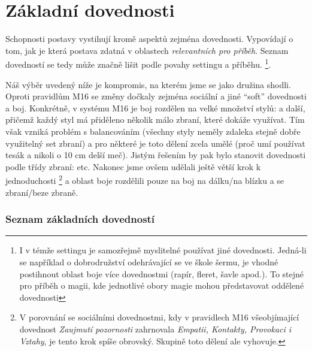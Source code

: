 \chapter{Základní dovednosti}
\label{chap:dovednosti}

Schopnosti postavy vystihují kromě aspektů zejména dovednosti. Vypovídají o tom, jak je která postava zdatná v oblastech \textit{relevantních pro příběh}. Seznam dovedností se tedy může značně lišit podle povahy settingu a příběhu. \footnote{I v témže settingu je samozřejmě myslitelné používat jiné dovednosti. Jedná-li se například o dobrodružství odehrávající se ve škole šermu, je vhodné postihnout oblast boje více dovednostmi (rapír, fleret, šavle apod.). To stejné pro příběh o magii, kde jednotlivé obory magie mohou představovat oddělené dovednosti}.

Náš výběr uvedený níže je kompromis, na kterém jsme se jako družina shodli. Oproti pravidlům M16 se změny dočkaly zejména sociální a jiné ``soft'' dovednosti a boj. Konkrétně, v systému M16 je boj rozdělen na velké množství stylů:  a další, přičemž každý styl má přiděleno několik málo zbraní, které dokáže využívat. Tím však vzniká problém s balancováním (všechny styly neměly zdaleka stejně dobře využitelný set zbraní) a pro některé je toto dělení zcela umělé (proč  umí používat tesák a nikoli o 10 cm delší meč). Jistým řešením by pak bylo stanovit dovednosti podle třídy zbraní:  etc. Nakonec jsme ovšem udělali ještě větší krok k jednoduchosti \footnote{V porovnání se sociálními dovednostmi, kdy v pravidlech M16 všeobjímající dovednost \textit{Zaujmutí pozornosti} zahrnovala \textit{Empatii, Kontakty, Provokaci i Vztahy}, je tento krok spíše obrovský. Skupině toto dělení ale vyhovuje.} a oblast boje rozdělili pouze na boj na dálku/na blízku a se zbraní/beze zbraně.


\subsection{Seznam základních dovedností}
\label{sec:seznam-dov}

